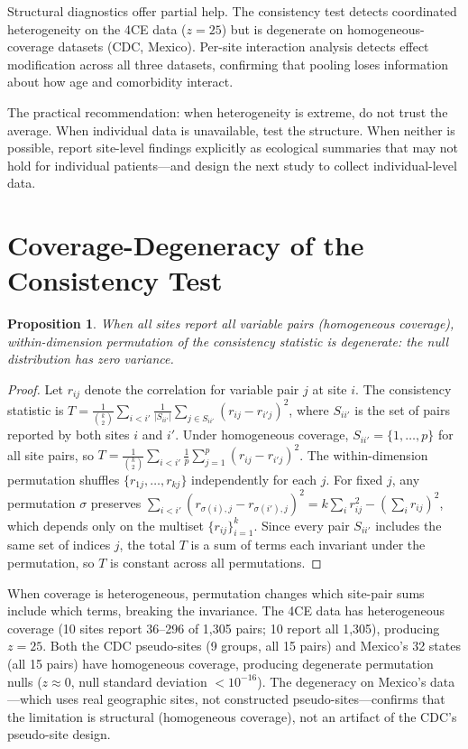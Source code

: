 \documentclass{article}
\newtheorem{proposition}{Proposition}
\begin{document}
Structural diagnostics offer partial help.  The consistency test detects
coordinated heterogeneity on the 4CE data ($z = 25$) but is degenerate on
homogeneous-coverage datasets (CDC, Mexico).  Per-site interaction analysis
detects effect modification across all three datasets, confirming that
pooling loses information about how age and comorbidity interact.

The practical recommendation: when heterogeneity is extreme, do not trust the
average.  When individual data is unavailable, test the structure.  When
neither is possible, report site-level findings explicitly as ecological
summaries that may not hold for individual patients---and design the next
study to collect individual-level data.


\appendix

\section{Coverage-Degeneracy of the Consistency Test}
\label{app:degeneracy}

\begin{proposition}
When all sites report all variable pairs (homogeneous coverage), within-dimension permutation of the consistency statistic is degenerate: the null distribution has zero variance.
\end{proposition}

\begin{proof}
Let $r_{ij}$ denote the correlation for variable pair $j$ at site $i$.  The consistency statistic is $T = \frac{1}{\binom{k}{2}} \sum_{i < i'} \frac{1}{|S_{ii'}|} \sum_{j \in S_{ii'}} (r_{ij} - r_{i'j})^2$, where $S_{ii'}$ is the set of pairs reported by both sites $i$ and $i'$.
Under homogeneous coverage, $S_{ii'} = \{1, \ldots, p\}$ for all site pairs, so $T = \frac{1}{\binom{k}{2}} \sum_{i < i'} \frac{1}{p} \sum_{j=1}^{p} (r_{ij} - r_{i'j})^2$.
The within-dimension permutation shuffles $\{r_{1j}, \ldots, r_{kj}\}$ independently for each $j$.
For fixed $j$, any permutation $\sigma$ preserves $\sum_{i<i'} (r_{\sigma(i),j} - r_{\sigma(i'),j})^2 = k \sum_i r_{ij}^2 - (\sum_i r_{ij})^2$, which depends only on the multiset $\{r_{ij}\}_{i=1}^k$.
Since every pair $S_{ii'}$ includes the same set of indices $j$, the total $T$ is a sum of terms each invariant under the permutation, so $T$ is constant across all permutations.
\end{proof}

When coverage is heterogeneous, permutation changes which site-pair sums include which terms, breaking the invariance.  The 4CE data has heterogeneous coverage (10 sites report 36--296 of 1,305 pairs; 10 report all 1,305), producing $z = 25$.  Both the CDC pseudo-sites (9 groups, all 15 pairs) and Mexico's 32 states (all 15 pairs) have homogeneous coverage, producing degenerate permutation nulls ($z \approx 0$, null standard deviation $< 10^{-16}$).  The degeneracy on Mexico's data---which uses real geographic sites, not constructed pseudo-sites---confirms that the limitation is structural (homogeneous coverage), not an artifact of the CDC's pseudo-site design.
\end{document}
